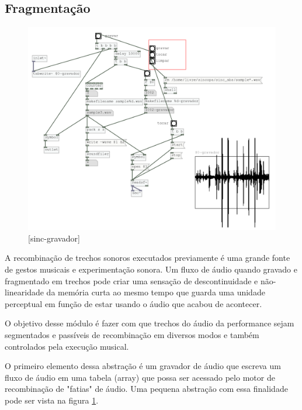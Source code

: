 \documentclass[draft]{ppgmus}
\begin{document}
\subsection {Fragmentação}


\begin{figure}
\includegraphics[scale=.6]{sinc-gravador}
\caption{[sinc-gravador]}
\label{sinc-gravador}
\end{figure}



A recombinação de trechos sonoros executados previamente é uma grande fonte
de gestos musicais e experimentação sonora. Um fluxo de áudio quando gravado
e fragmentado em trechos pode criar uma sensação de descontinuidade e não-linearidade
da memória curta ao mesmo tempo que guarda uma unidade perceptual em função de estar usando
o áudio que acabou de acontecer.

O objetivo desse módulo é fazer com que trechos do áudio da performance sejam segmentados e 
passíveis de recombinação em diversos modos e também controlados pela execução musical.

O primeiro elemento dessa abstração é um gravador de áudio que escreva um fluxo
de áudio em uma tabela (array) que possa ser acessado pelo motor de recombinação de "fatias" de áudio.
Uma pequena abstração com essa finalidade pode ser vista na figura \ref{sinc-gravador}.
\end{document}
